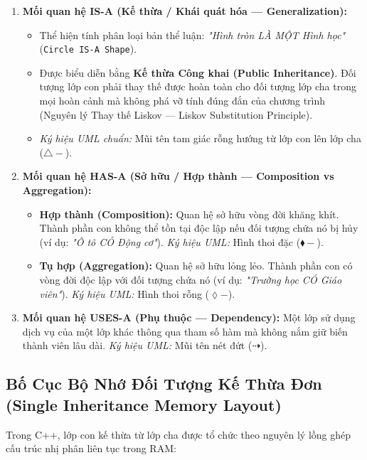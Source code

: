 \documentclass[12pt,a4paper,oneside]{book}
\begin{document}
\begin{enumerate}
    \item \textbf{Mối quan hệ IS-A (Kế thừa / Khái quát hóa --- Generalization):}
    \begin{itemize}
        \item Thể hiện tính phân loại bản thể luận: \textit{"Hình tròn LÀ MỘT Hình học"} (\texttt{Circle IS-A Shape}).
        \item Được biểu diễn bằng \textbf{Kế thừa Công khai (Public Inheritance)}. Đối tượng lớp con phải thay thế được hoàn toàn cho đối tượng lớp cha trong mọi hoàn cảnh mà không phá vỡ tính đúng đắn của chương trình (Nguyên lý Thay thế Liskov --- Liskov Substitution Principle).
        \item \textit{Ký hiệu UML chuẩn:} Mũi tên tam giác rỗng hướng từ lớp con lên lớp cha ($\triangle-$).
    \end{itemize}

    \item \textbf{Mối quan hệ HAS-A (Sở hữu / Hợp thành --- Composition vs Aggregation):}
    \begin{itemize}
        \item \textbf{Hợp thành (Composition):} Quan hệ sở hữu vòng đời khăng khít. Thành phần con không thể tồn tại độc lập nếu đối tượng chứa nó bị hủy (ví dụ: \textit{"Ô tô CÓ Động cơ"}).
        \textit{Ký hiệu UML:} Hình thoi đặc ($\blacklozenge-$).
        \item \textbf{Tụ hợp (Aggregation):} Quan hệ sở hữu lỏng lẻo. Thành phần con có vòng đời độc lập với đối tượng chứa nó (ví dụ: \textit{"Trường học CÓ Giáo viên"}).
        \textit{Ký hiệu UML:} Hình thoi rỗng ($\lozenge-$).
    \end{itemize}

    \item \textbf{Mối quan hệ USES-A (Phụ thuộc --- Dependency):}
    Một lớp sử dụng dịch vụ của một lớp khác thông qua tham số hàm mà không nắm giữ biến thành viên lâu dài.
    \textit{Ký hiệu UML:} Mũi tên nét đứt ($\dashrightarrow$).
\end{enumerate}

\subsection{Bố Cục Bộ Nhớ Đối Tượng Kế Thừa Đơn (Single Inheritance Memory Layout)}

Trong C++, lớp con kế thừa từ lớp cha được tổ chức theo nguyên lý lồng ghép cấu trúc nhị phân liên tục trong RAM:
\end{document}
